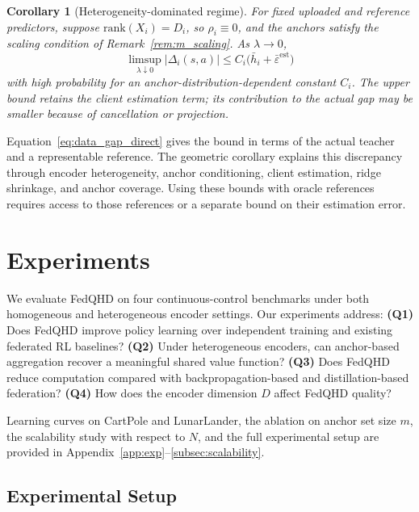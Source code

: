 \documentclass[sigconf,anonymous]{aamas}
\theoremstyle{plain}
\newtheorem{corollary}{Corollary}
\theoremstyle{definition}
\theoremstyle{remark}
\begin{document}
\begin{corollary}[Heterogeneity-dominated regime]
\label{col:phase_transition}
For fixed uploaded and reference predictors, suppose
$\mathrm{rank}(X_i)=D_i$, so $\rho_i\equiv0$, and the anchors
satisfy the scaling condition of Remark~\ref{rem:m_scaling}.  As
$\lambda\to0$,
\[
\limsup_{\lambda\downarrow0}|\Delta_i(s,a)|
\le
C_i\bigl(\bar h_i+\bar\varepsilon^{\mathrm{est}}\bigr)
\]
with high probability for an anchor-distribution-dependent constant
$C_i$.  The upper bound retains the client estimation term; its
contribution to the actual gap may be smaller because of cancellation
or projection.
\end{corollary}

Equation~\eqref{eq:data_gap_direct} gives the bound in terms of the
actual teacher and a representable reference.  The geometric corollary
explains this discrepancy through encoder heterogeneity, anchor
conditioning, client estimation, ridge shrinkage, and anchor coverage.
Using these bounds with oracle references requires access to those
references or a separate bound on their estimation error.



\section{Experiments}
\label{sec:experiments}


We evaluate FedQHD on four continuous-control benchmarks under both
homogeneous and heterogeneous encoder settings. Our experiments address:
\textbf{(Q1)} Does FedQHD improve policy learning over independent
training and existing federated RL baselines?
\textbf{(Q2)} Under heterogeneous encoders, can anchor-based aggregation
recover a meaningful shared value function?
\textbf{(Q3)} Does FedQHD reduce computation compared with
backpropagation-based and distillation-based federation?
\textbf{(Q4)} How does the encoder dimension $D$ affect FedQHD quality?

Learning curves on CartPole and LunarLander, the ablation on anchor set size $m$, the scalability study
with respect to $N$, and the full experimental setup are provided in Appendix~\ref{app:exp}--\ref{subsec:scalability}.


\subsection{Experimental Setup}
\label{subsec:exp_setup}
\end{document}
